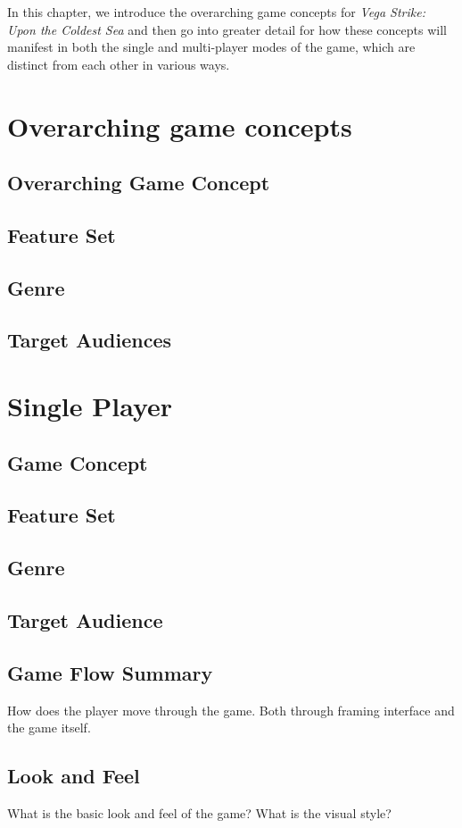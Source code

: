 In this chapter, we introduce the overarching game concepts for {\it Vega Strike: Upon the Coldest Sea} and then go into greater detail for how these concepts will manifest in both the single and multi-player modes of the game, which are distinct from each other in various ways.

\section{Overarching game concepts}
\subsection{Overarching Game Concept}
\subsection{Feature Set}
\subsection{Genre}
\subsection{Target Audiences}

\section{Single Player}
\subsection{Game Concept}
\subsection{Feature Set}
\subsection{Genre}
\subsection{Target Audience}
\subsection{Game Flow Summary}
How does the player move through the game.   Both through framing interface and the game itself.
\subsection{Look and Feel}  
What is the basic look and feel of the game?  What is the visual style?
